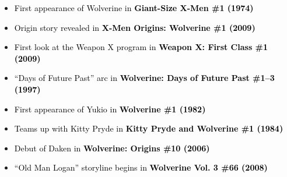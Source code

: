 \documentclass[12pt]{article}
\begin{document}
\begin{center}
\begin{tcolorbox}[
  colback=white!0,      %
  colframe=black,
  width=0.9\textwidth,
  arc=4mm,
  auto outer arc,
  boxrule=0.8pt,
  left=10pt, right=10pt, top=10pt, bottom=10pt
]
\begin{itemize}[left=0pt]
    \item \textcolor{black}{First appearance of Wolverine in \textbf{Giant-Size X-Men \#1 (1974)}}
    \item \textcolor{black}{Origin story revealed in \textbf{X-Men Origins: Wolverine \#1 (2009)}}
    \item \textcolor{black}{First look at the Weapon X program in \textbf{Weapon X: First Class \#1 (2009)}}
    \item \textcolor{black}{“Days of Future Past” arc in \textbf{Wolverine: Days of Future Past \#1–3 (1997)}}
    \item \textcolor{black}{First appearance of Yukio in \textbf{Wolverine \#1 (1982)}}
    \item \textcolor{black}{Teams up with Kitty Pryde in \textbf{Kitty Pryde and Wolverine \#1 (1984)}}
    \item \textcolor{black}{Debut of Daken in \textbf{Wolverine: Origins \#10 (2006)}}
    \item \textcolor{black}{“Old Man Logan” storyline begins in \textbf{Wolverine Vol. 3 \#66 (2008)}}
\end{itemize}
\end{tcolorbox}
\end{center}

\newpage
{}
\end{document}
